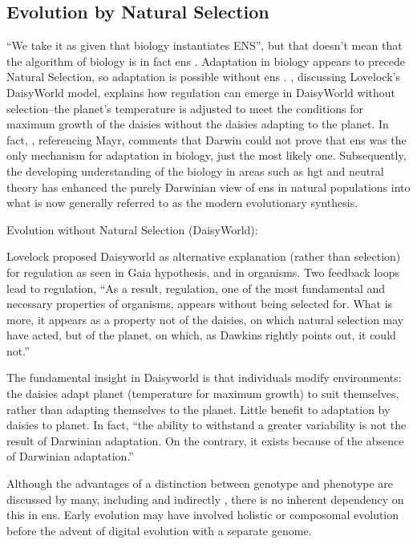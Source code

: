 \subsection{Evolution by Natural Selection}\label{evolution-by-natural-selection}
\begin{NOTES}
``We take it as given that biology instantiates ENS'', but that doesn't mean that the algorithm of biology is in fact \gls{ens} \parencite{Watson2012}. Adaptation in biology appears to precede Natural Selection, so adaptation is possible without \gls{ens} \cite{Watson2010}. \cite{Saunders1994}, discussing Lovelock's DaisyWorld model, explains how regulation can emerge in DaisyWorld without selection--the planet's temperature is adjusted to meet the conditions for maximum growth of the daisies without the daisies adapting to the planet. In fact, \cite{Saunders1994}, referencing Mayr, comments that Darwin could not prove that \gls{ens} was the only mechanism for adaptation in biology, just the most likely one. Subsequently, the developing understanding of the biology in areas such as \gls{hgt} and neutral theory \cite{Kimura:1968uq} has enhanced the purely Darwinian view of \gls{ens} in natural populations into what is now generally referred to as the modern evolutionary synthesis.


\autocite{Saunders1994} Evolution without Natural Selection (DaisyWorld):

Lovelock proposed Daisyworld as alternative explanation (rather than selection) for regulation as seen in Gaia hypothesis, and in organisms. Two feedback loops lead to regulation, ``As a result, regulation, one of the most fundamental and necessary properties of organisms, appears without being selected for. What is more, it appears as a property not of the daisies, on which natural selection may have acted, but of the planet, on which, as Dawkins rightly points out, it could not.''

The fundamental insight in Daisyworld is that individuals modify environments: the daisies adapt planet (temperature for maximum growth) to suit themselves, rather than adapting themselves to the planet. Little benefit to adaptation by daisies to planet. In fact, ``the ability to withstand a greater variability is not the result of Darwinian adaptation. On the contrary, it exists because of the absence of Darwinian adaptation.''



Although the advantages of a distinction between genotype and phenotype are discussed by many, including \parencite[section 7.2.3]{Taylor1999} and indirectly \cite{VonNeumann1966}, there is no inherent dependency on this in \gls{ens}. Early evolution may have involved holistic or composomal evolution before the advent of digital evolution with a separate genome.


\end{NOTES}
